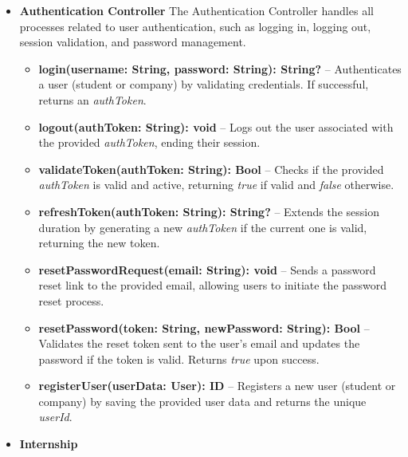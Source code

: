 \begin{itemize}
\item \textbf{Authentication Controller}
The Authentication Controller handles all processes related to user authentication, such as logging in, logging out, session validation, and password management.

\begin{itemize}
    \item \textbf{login(username: String, password: String): String?} – Authenticates a user (student or company) by validating credentials. If successful, returns an \textit{authToken}.
    \item \textbf{logout(authToken: String): void} – Logs out the user associated with the provided \textit{authToken}, ending their session.
    \item \textbf{validateToken(authToken: String): Bool} – Checks if the provided \textit{authToken} is valid and active, returning \textit{true} if valid and \textit{false} otherwise.
    \item \textbf{refreshToken(authToken: String): String?} – Extends the session duration by generating a new \textit{authToken} if the current one is valid, returning the new token.
    \item \textbf{resetPasswordRequest(email: String): void} – Sends a password reset link to the provided email, allowing users to initiate the password reset process.
    \item \textbf{resetPassword(token: String, newPassword: String): Bool} – Validates the reset token sent to the user's email and updates the password if the token is valid. Returns \textit{true} upon success.
    \item \textbf{registerUser(userData: User): ID} – Registers a new user (student or company) by saving the provided user data and returns the unique \textit{userId}.
\end{itemize}

\item \textbf{Internship}


\end{itemize}
